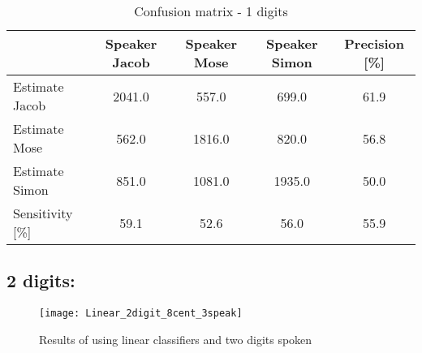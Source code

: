 \begin{table}[H]                                                    
\centering                                                          
\begin{tabular}{|l|c|c|c|c|}                                        
\hline                                                              
  & Speaker Jacob & Speaker Mose & Speaker Simon & Precision [\%] \\
\hline                                                              
Estimate Jacob & 2041.0 & 557.0 & 699.0 & 61.9 \\                   
\hline                                                              
Estimate Mose & 562.0 & 1816.0 & 820.0 & 56.8 \\                    
\hline                                                              
Estimate Simon & 851.0 & 1081.0 & 1935.0 & 50.0 \\                  
\hline                                                              
Sensitivity [\%] & 59.1 & 52.6 & 56.0 & 55.9 \\                     
\hline                                                              
\end{tabular}                                                       
\caption{Confusion matrix - 1 digits}                               
\label{table:Lin_conf_1}                                            
\end{table}    
                   

\subsection{2 digits:}

\begin{figure}[H]
\centering
\texttt{[image: Linear\_2digit\_8cent\_3speak]}
\caption{Results of using linear classifiers and two digits spoken}
\label{fig:Lin_fig_2}
\end{figure}

